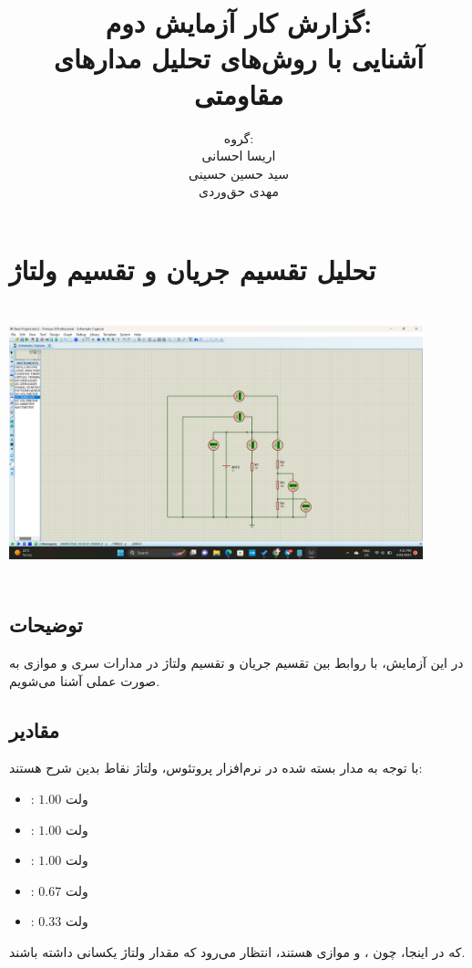 \documentclass{article}
\title{گزارش کار آزمایش دوم:‌\\آشنایی با روش‌های تحلیل مدارهای مقاومتی}
\author{
	گروه: \\
	اریسا احسانی \\
	سید حسین حسینی \\
	مهدی حق‌وردی
}
\date{}
\begin{document}
	\maketitle
	\tableofcontents
	\clearpage
	
	\section{تحلیل تقسیم جریان و تقسیم ولتاژ}
		\begin{center}
			\includegraphics[width=12cm, height=8cm]{./images/1}
		\end{center}
		
		\subsection{توضیحات}
			در این آزمایش، با روابط بین تقسیم جریان و تقسیم ولتاژ‌ در مدارات سری و موازی به صورت عملی آشنا می‌شویم.
			
		\subsection{مقادیر}
		با توجه به مدار بسته شده در نرم‌افزار پروتئوس، ولتاژ نقاط بدین شرح هستند:
		
		\begin{itemize}
			\item {}: $1.00$ ولت
			\item {}: $1.00$ ولت 
			\item {}: $1.00$ ولت
			\item {}: $0.67$ ولت
			\item {}: $0.33$ ولت
		\end{itemize}
		که در اینجا، چون ،  و  موازی هستند، انتظار می‌رود که مقدار ولتاژ یکسانی داشته باشند. \\
	
\end{document}
